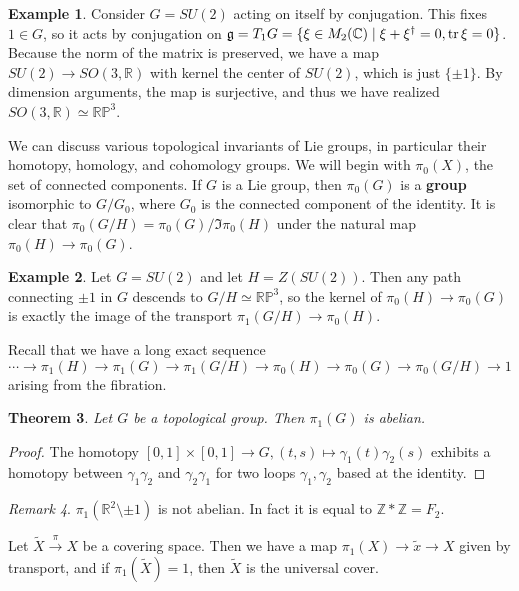 \documentclass[leqno, openany]{memoir}
\newtheorem{thm}{Theorem}[section]
\theoremstyle{definition}
\newtheorem{exm}[thm]{Example}
\theoremstyle{remark}
\newtheorem{rmk}[thm]{Remark}
\theoremstyle{plain}
\theoremstyle{definition}
\theoremstyle{remark}
\newcommand{\R}{\mathbb{R}}
\newcommand{\C}{\mathbb{C}}
\newcommand{\Z}{\mathbb{Z}}
\renewcommand{\P}{\mathbb{P}}
\newcommand{\mf}[1]{\mathfrak{#1}}
\newcommand{\wtl}[1]{\widetilde{#1}}
\begin{document}
\begin{exm}
    Consider $G = SU(2)$ acting on itself by conjugation. This fixes $1 \in G$, so it acts by conjugation on $\mf{g} = T_1 G = \{ \xi \in M_2(\C) \mid \xi + \xi^{\dag} = 0, \trace \xi = 0 \}$. Because the norm of the matrix is preserved, we have a map $SU(2) \to SO(3, \R)$ with kernel the center of $SU(2)$, which is just $\{ \pm 1 \}$. By dimension arguments, the map is surjective, and thus we have realized $SO(3, \R) \simeq \R \P^3$.
\end{exm}

We can discuss various topological invariants of Lie groups, in particular their homotopy, homology, and cohomology groups. We will begin with $\pi_0(X)$, the set of connected components. If $G$ is a Lie group, then $\pi_0(G)$ is a \textbf{group} isomorphic to $G / G_0$, where $G_0$ is the connected component of the identity. It is clear that $\pi_0(G/H) = \pi_0(G) / \Im \pi_0(H)$ under the natural map $\pi_0(H) \to \pi_0(G)$.

\begin{exm}
    Let $G = SU(2)$ and let $H = Z(SU(2))$. Then any path connecting $\pm 1$ in $G$ descends to $G/H \simeq \R\P^3$, so the kernel of $\pi_0(H) \to \pi_0(G)$ is exactly the image of the transport $\pi_1(G/H) \to \pi_0(H)$.
\end{exm}

Recall that we have a long exact sequence
\[ \cdots \to \pi_1(H) \to \pi_1(G) \to \pi_1(G/H) \to \pi_0(H) \to \pi_0(G) \to \pi_0(G/H) \to 1 \]
arising from the fibration. 

\begin{thm}
    Let $G$ be a topological group. Then $\pi_1(G)$ is abelian.
\end{thm}

\begin{proof}
    The homotopy $[0,1] \times [0,1] \to G, (t,s) \mapsto \gamma_1(t) \gamma_2(s)$ exhibits a homotopy between $\gamma_1 \gamma_2$ and $\gamma_2 \gamma_1$ for two loops $\gamma_1, \gamma_2$ based at the identity.
\end{proof}

\begin{rmk}
    $\pi_1(\R^2 \setminus \pm 1)$ is not abelian. In fact it is equal to $\Z * \Z = F_2$.
\end{rmk}

Let $\wtl{X} \xrightarrow{\pi} X$ be a covering space. Then we have a map $\pi_1(X) \to \wtl{x} \to X$ given by transport, and if $\pi_1(\wtl{X}) = 1$, then $\wtl{X}$ is the universal cover.
\end{document}
